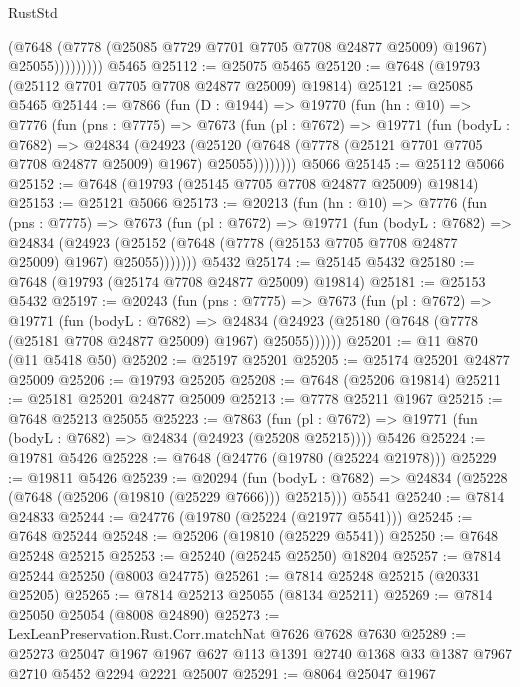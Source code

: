 \begin{lexlean}{RustStd}
\begin{coremodule}
                    (@7648
                      (@7778 (@25085 @7729 @7701 @7705 @7708 @24877 @25009) @1967)
                      @25055)))))))))
    @5465
@25112 := @25075 @5465
@25120 := @7648 (@19793 (@25112 @7701 @7705 @7708 @24877 @25009) @19814)
@25121 := @25085 @5465
@25144 := @7866
    (fun (D : @1944) =>
    @19770
      (fun (hn : @10) =>
      @7776
        (fun (pns : @7775) =>
        @7673
          (fun (pl : @7672) =>
          @19771
            (fun (bodyL : @7682) =>
            @24834
              (@24923
                (@25120 (@7648 (@7778 (@25121 @7701 @7705 @7708 @24877 @25009) @1967) @25055))))))))
    @5066
@25145 := @25112 @5066
@25152 := @7648 (@19793 (@25145 @7705 @7708 @24877 @25009) @19814)
@25153 := @25121 @5066
@25173 := @20213
    (fun (hn : @10) =>
    @7776
      (fun (pns : @7775) =>
      @7673
        (fun (pl : @7672) =>
        @19771
          (fun (bodyL : @7682) =>
          @24834
            (@24923 (@25152 (@7648 (@7778 (@25153 @7705 @7708 @24877 @25009) @1967) @25055)))))))
    @5432
@25174 := @25145 @5432
@25180 := @7648 (@19793 (@25174 @7708 @24877 @25009) @19814)
@25181 := @25153 @5432
@25197 := @20243
    (fun (pns : @7775) =>
    @7673
      (fun (pl : @7672) =>
      @19771
        (fun (bodyL : @7682) =>
        @24834 (@24923 (@25180 (@7648 (@7778 (@25181 @7708 @24877 @25009) @1967) @25055))))))
@25201 := @11 @870 (@11 @5418 @50)
@25202 := @25197 @25201
@25205 := @25174 @25201 @24877 @25009
@25206 := @19793 @25205
@25208 := @7648 (@25206 @19814)
@25211 := @25181 @25201 @24877 @25009
@25213 := @7778 @25211 @1967
@25215 := @7648 @25213 @25055
@25223 := @7863
    (fun (pl : @7672) => @19771 (fun (bodyL : @7682) => @24834 (@24923 (@25208 @25215))))
    @5426
@25224 := @19781 @5426
@25228 := @7648 (@24776 (@19780 (@25224 @21978)))
@25229 := @19811 @5426
@25239 := @20294
    (fun (bodyL : @7682) => @24834 (@25228 (@7648 (@25206 (@19810 (@25229 @7666))) @25215)))
    @5541
@25240 := @7814 @24833
@25244 := @24776 (@19780 (@25224 (@21977 @5541)))
@25245 := @7648 @25244
@25248 := @25206 (@19810 (@25229 @5541))
@25250 := @7648 @25248 @25215
@25253 := @25240 (@25245 @25250) @18204
@25257 := @7814 @25244 @25250 (@8003 @24775)
@25261 := @7814 @25248 @25215 (@20331 @25205)
@25265 := @7814 @25213 @25055 (@8134 @25211)
@25269 := @7814 @25050 @25054 (@8008 @24890)
@25273 := LexLeanPreservation.Rust.Corr.matchNat @7626 @7628 @7630
@25289 := @25273
    @25047
    @1967
    @1967
    @627
    @113
    @1391
    @2740
    @1368
    @33
    @1387
    @7967
    @2710
    @5452
    @2294
    @2221
    @25007
@25291 := @8064 @25047 @1967

\end{coremodule}
\end{lexlean}
